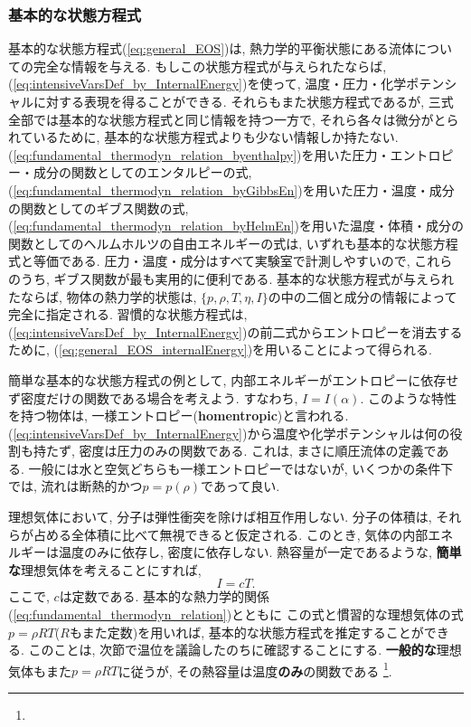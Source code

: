 \subsubsection*{基本的な状態方程式}
基本的な状態方程式(\ref{eq:general_EOS})は, 熱力学的平衡状態にある流体についての完全な情報を与える. 
もしこの状態方程式が与えられたならば, (\ref{eq:intensiveVarsDef_by_InternalEnergy})を使って, 
温度・圧力・化学ポテンシャルに対する表現を得ることができる. 
それらもまた状態方程式であるが, 
三式全部では基本的な状態方程式と同じ情報を持つ一方で, 
それら各々は微分がとられているために, 基本的な状態方程式よりも少ない情報しか持たない. 
(\ref{eq:fundamental_thermodyn_relation_byenthalpy})を用いた圧力・エントロピー・成分の関数としてのエンタルピーの式, 
(\ref{eq:fundamental_thermodyn_relation_byGibbsEn})を用いた圧力・温度・成分の関数としてのギブス関数の式, 
(\ref{eq:fundamental_thermodyn_relation_byHelmEn})を用いた温度・体積・成分の関数としてのヘルムホルツの自由エネルギーの式は, 
いずれも基本的な状態方程式と等価である. 
圧力・温度・成分はすべて実験室で計測しやすいので, これらのうち, ギブス関数が最も実用的に便利である. 
基本的な状態方程式が与えられたならば, 物体の熱力学的状態は, $\{p,\rho,T,\eta,I\}$の中の二個と成分の情報によって完全に指定される. 
習慣的な状態方程式は,　(\ref{eq:intensiveVarsDef_by_InternalEnergy})の前二式からエントロピーを消去するために, 
(\ref{eq:general_EOS_internalEnergy})を用いることによって得られる. 

簡単な基本的な状態方程式の例として, 内部エネルギーがエントロピーに依存せず密度だけの関数である場合を考えよう. 
すなわち, $I=I(\alpha)$. 
このような特性を持つ物体は, 一様エントロピー(\textbf{homentropic})と言われる. 
(\ref{eq:intensiveVarsDef_by_InternalEnergy})から温度や化学ポテンシャルは何の役割も持たず, 
密度は圧力のみの関数である. 
これは, まさに順圧流体の定義である. 
一般には水と空気どちらも一様エントロピーではないが, 
いくつかの条件下では, 流れは断熱的かつ$p=p(\rho)$であって良い. 

理想気体において, 分子は弾性衝突を除けば相互作用しない. 
分子の体積は, それらが占める全体積に比べて無視できると仮定される. 
このとき, 気体の内部エネルギーは温度のみに依存し, 密度に依存しない. 
熱容量が一定であるような, \textbf{簡単な}理想気体を考えることにすれば, 
\begin{equation}
 I = cT. 
 \label{eq:internalEn_idealGas_constCv}
\end{equation} 
ここで, $c$は定数である. 
基本的な熱力学的関係(\ref{eq:fundamental_thermodyn_relation})とともに
この式と慣習的な理想気体の式$p=\rho R T$($R$もまた定数)を用いれば, 
基本的な状態方程式を推定することができる. 
このことは, 次節で温位を議論したのちに確認することにする. 
\textbf{一般的な}理想気体もまた$p=\rho R T$に従うが, 
その熱容量は温度\textbf{のみ}の関数である %
\footnote{

}. 

